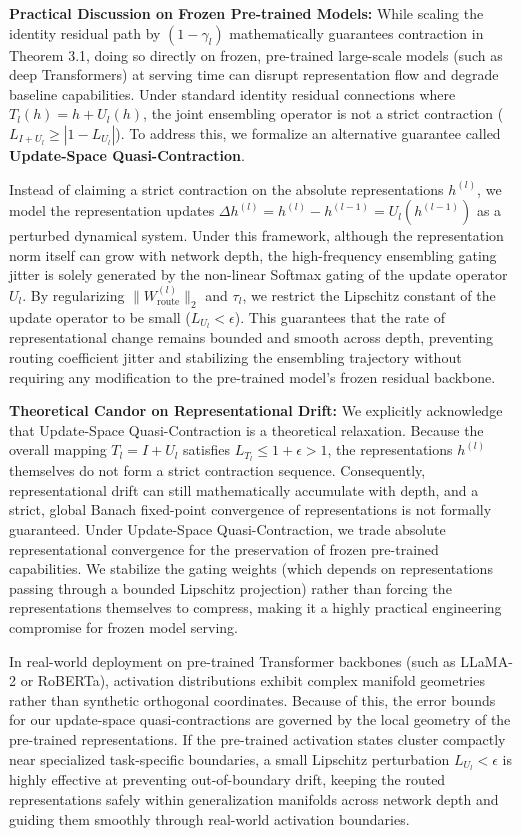 \textbf{Practical Discussion on Frozen Pre-trained Models:}
While scaling the identity residual path by $(1-\gamma_l)$ mathematically guarantees contraction in Theorem 3.1, doing so directly on frozen, pre-trained large-scale models (such as deep Transformers) at serving time can disrupt representation flow and degrade baseline capabilities. Under standard identity residual connections where $T_l(h) = h + U_l(h)$, the joint ensembling operator is not a strict contraction ($L_{I + U_l} \ge |1 - L_{U_l}|$). To address this, we formalize an alternative guarantee called \textbf{Update-Space Quasi-Contraction}. 

Instead of claiming a strict contraction on the absolute representations $h^{(l)}$, we model the representation updates $\Delta h^{(l)} = h^{(l)} - h^{(l-1)} = U_l(h^{(l-1)})$ as a perturbed dynamical system. Under this framework, although the representation norm itself can grow with network depth, the high-frequency ensembling gating jitter is solely generated by the non-linear Softmax gating of the update operator $U_l$. By regularizing $\|W_{\text{route}}^{(l)}\|_2$ and $\tau_l$, we restrict the Lipschitz constant of the update operator to be small ($L_{U_l} < \epsilon$). This guarantees that the rate of representational change remains bounded and smooth across depth, preventing routing coefficient jitter and stabilizing the ensembling trajectory without requiring any modification to the pre-trained model's frozen residual backbone.

\textbf{Theoretical Candor on Representational Drift:}
We explicitly acknowledge that Update-Space Quasi-Contraction is a theoretical relaxation. Because the overall mapping $T_l = I + U_l$ satisfies $L_{T_l} \le 1 + \epsilon > 1$, the representations $h^{(l)}$ themselves do not form a strict contraction sequence. Consequently, representational drift can still mathematically accumulate with depth, and a strict, global Banach fixed-point convergence of representations is not formally guaranteed. Under Update-Space Quasi-Contraction, we trade absolute representational convergence for the preservation of frozen pre-trained capabilities. We stabilize the gating weights (which depends on representations passing through a bounded Lipschitz projection) rather than forcing the representations themselves to compress, making it a highly practical engineering compromise for frozen model serving.

In real-world deployment on pre-trained Transformer backbones (such as LLaMA-2 or RoBERTa), activation distributions exhibit complex manifold geometries rather than synthetic orthogonal coordinates. Because of this, the error bounds for our update-space quasi-contractions are governed by the local geometry of the pre-trained representations. If the pre-trained activation states cluster compactly near specialized task-specific boundaries, a small Lipschitz perturbation $L_{U_l} < \epsilon$ is highly effective at preventing out-of-boundary drift, keeping the routed representations safely within generalization manifolds across network depth and guiding them smoothly through real-world activation boundaries.

